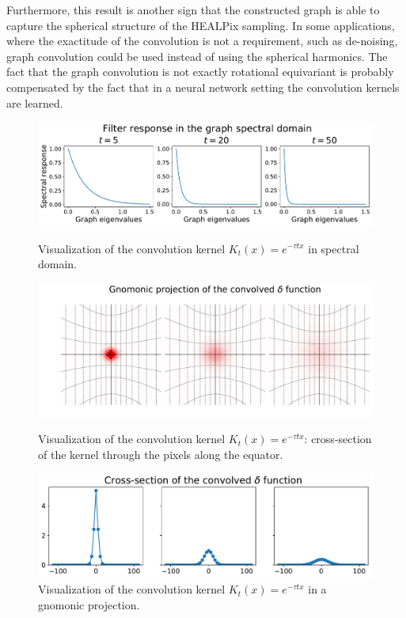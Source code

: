 \documentclass[final,twocolumn,3p,times,authoryear]{elsarticle}
\newcommand{\todo}[1]{{\color[rgb]{.6,.1,.6}{#1}}}
\newcommand{\1}{\b{1}}              %
\newcommand{\0}{\b{0}}              %
\begin{document}
Furthermore, this result is another sign that the constructed graph is able to capture the spherical
structure of the HEALPix sampling. In some applications, where the
exactitude of the convolution is not a requirement, such as de-noising, graph convolution could be used instead of using the spherical harmonics.
The fact that the graph convolution is not exactly rotational equivariant is probably compensated by the fact that in a neural network setting the convolution kernels are learned.
\todo{not ideal tho as the graph convolution depends on the localization}


\begin{figure}
\centering
\includegraphics[width=\linewidth]{gaussian_filters_spectral}
\caption{Visualization of the convolution kernel $K_t(x)=e^{-\tau t x}$ in spectral domain.}
\vspace{0.3in}
\includegraphics[width=\linewidth]{gaussian_filters_gnomonic}
\caption{Visualization of the convolution kernel $K_t(x)=e^{-\tau t x}$: cross-section of the kernel through the pixels along the equator.}
\vspace{0.3in}
\includegraphics[width=\linewidth]{gaussian_filters_section}
\caption{Visualization of the convolution kernel $K_t(x)=e^{-\tau t x}$ in a gnomonic projection.}
\label{fig:gaussian_filters_visualization}
\end{figure}
\end{document}
